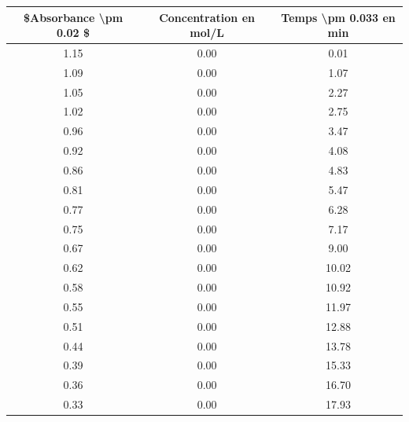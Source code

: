 \documentclass[12pt]{article}
\begin{document}
\begin{table}[h!]
\begin{center}
    \begin{tabular}{|c|c|c|}
        \hline
        \$Absorbance \textbackslash pm 0.02 \$ & Concentration en mol/L & Temps \textbackslash pm 0.033 en min \\
        \hline
                          1.15 &                   0.00 &                   0.01 \\
                          1.09 &                   0.00 &                   1.07 \\
                          1.05 &                   0.00 &                   2.27 \\
                          1.02 &                   0.00 &                   2.75 \\
                          0.96 &                   0.00 &                   3.47 \\
                          0.92 &                   0.00 &                   4.08 \\
                          0.86 &                   0.00 &                   4.83 \\
                          0.81 &                   0.00 &                   5.47 \\
                          0.77 &                   0.00 &                   6.28 \\
                          0.75 &                   0.00 &                   7.17 \\
                          0.67 &                   0.00 &                   9.00 \\
                          0.62 &                   0.00 &                  10.02 \\
                          0.58 &                   0.00 &                  10.92 \\
                          0.55 &                   0.00 &                  11.97 \\
                          0.51 &                   0.00 &                  12.88 \\
                          0.44 &                   0.00 &                  13.78 \\
                          0.39 &                   0.00 &                  15.33 \\
                          0.36 &                   0.00 &                  16.70 \\
                          0.33 &                   0.00 &                  17.93 \\

\end{tabular}
\end{center}
\end{table}
\end{document}
